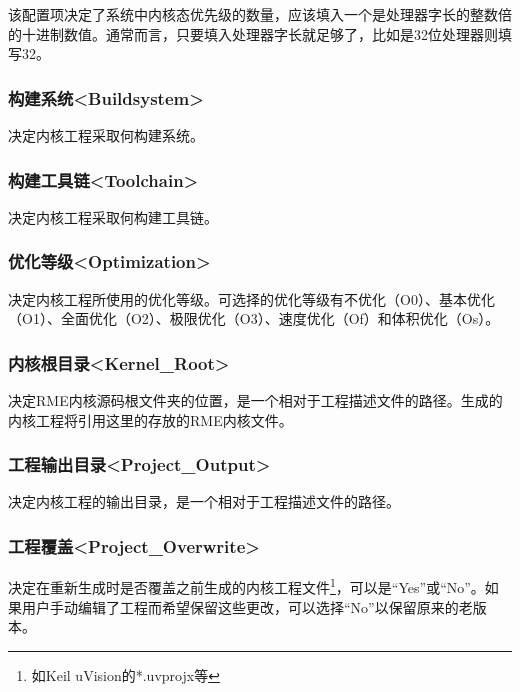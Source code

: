 该配置项决定了系统中内核态优先级的数量，应该填入一个是处理器字长的整数倍的十进制数值。通常而言，只要填入处理器字长就足够了，比如是32位处理器则填写32。

\subsubsection{构建系统<Buildsystem>{}}\label{subsubsec:5-3-12-9}

决定内核工程采取何构建系统。

\subsubsection{构建工具链<Toolchain>{}}\label{subsubsec:5-3-12-10}

决定内核工程采取何构建工具链。

\subsubsection{优化等级<Optimization>{}}\label{subsubsec:5-3-12-11}

决定内核工程所使用的优化等级。可选择的优化等级有不优化（O0）、基本优化（O1）、全面优化（O2）、极限优化（O3）、速度优化（Of）和体积优化（Os）。

\subsubsection{内核根目录<Kernel\_Root>{}}\label{subsubsec:5-3-12-12}

决定RME内核源码根文件夹的位置，是一个相对于工程描述文件的路径。生成的内核工程将引用这里的存放的RME内核文件。

\subsubsection{工程输出目录<Project\_Output>{}}\label{subsubsec:5-3-12-13}

决定内核工程的输出目录，是一个相对于工程描述文件的路径。

\subsubsection{工程覆盖<Project\_Overwrite>{}}\label{subsubsec:5-3-12-14}

决定在重新生成时是否覆盖之前生成的内核工程文件\footnote{如Keil uVision的*.uvprojx等}，可以是``Yes''或``No''。如果用户手动编辑了工程而希望保留这些更改，可以选择``No''以保留原来的老版本。

